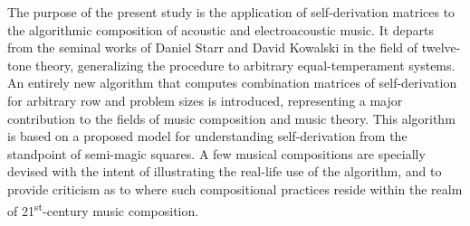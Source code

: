 The purpose of the present study is the application of self-derivation matrices to the algorithmic composition of acoustic and electroacoustic music. It departs from the seminal works of Daniel Starr and David Kowalski in the field of twelve-tone theory, generalizing the procedure to arbitrary equal-temperament systems. An entirely new algorithm that computes combination matrices of self-derivation for arbitrary row and problem sizes is introduced, representing a major contribution to the fields of music composition and music theory. This algorithm is based on a proposed model for understanding self-derivation from the standpoint of semi-magic squares. A few musical compositions are specially devised with the intent of illustrating the real-life use of the algorithm, and to provide criticism as to where such compositional practices reside within the realm of 21\textsuperscript{st}-century music composition.
